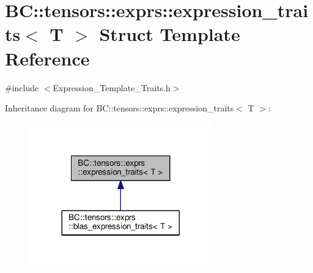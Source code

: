 \hypertarget{structBC_1_1tensors_1_1exprs_1_1expression__traits}{}\section{BC\+:\+:tensors\+:\+:exprs\+:\+:expression\+\_\+traits$<$ T $>$ Struct Template Reference}
\label{structBC_1_1tensors_1_1exprs_1_1expression__traits}


{\ttfamily \#include $<$Expression\+\_\+\+Template\+\_\+\+Traits.\+h$>$}



Inheritance diagram for BC\+:\+:tensors\+:\+:exprs\+:\+:expression\+\_\+traits$<$ T $>$\+:
\nopagebreak
\begin{figure}[H]
\begin{center}
\leavevmode
\includegraphics[width=224pt]{structBC_1_1tensors_1_1exprs_1_1expression__traits__inherit__graph}
\end{center}
\end{figure}
